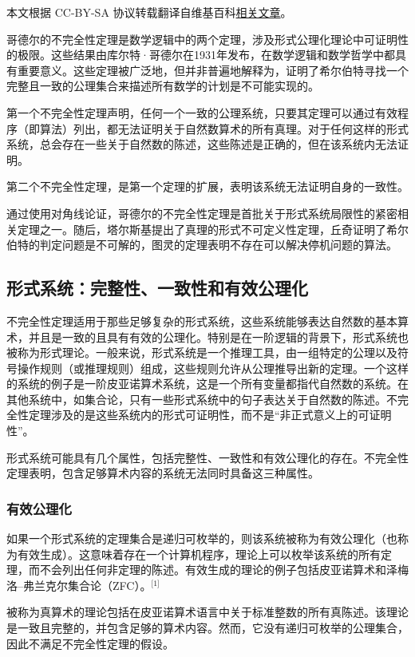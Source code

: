 
本文根据 CC-BY-SA 协议转载翻译自维基百科\href{https://en.wikipedia.org/wiki/G\%C3\%B6del\%27s_incompleteness_theorems}{相关文章}。

哥德尔的不完全性定理是数学逻辑中的两个定理，涉及形式公理化理论中可证明性的极限。这些结果由库尔特·哥德尔在1931年发布，在数学逻辑和数学哲学中都具有重要意义。这些定理被广泛地，但并非普遍地解释为，证明了希尔伯特寻找一个完整且一致的公理集合来描述所有数学的计划是不可能实现的。

第一个不完全性定理声明，任何一个一致的公理系统，只要其定理可以通过有效程序（即算法）列出，都无法证明关于自然数算术的所有真理。对于任何这样的形式系统，总会存在一些关于自然数的陈述，这些陈述是正确的，但在该系统内无法证明。

第二个不完全性定理，是第一个定理的扩展，表明该系统无法证明自身的一致性。

通过使用对角线论证，哥德尔的不完全性定理是首批关于形式系统局限性的紧密相关定理之一。随后，塔尔斯基提出了真理的形式不可定义性定理，丘奇证明了希尔伯特的判定问题是不可解的，图灵的定理表明不存在可以解决停机问题的算法。
\subsection{形式系统：完整性、一致性和有效公理化} 
不完全性定理适用于那些足够复杂的形式系统，这些系统能够表达自然数的基本算术，并且是一致的且具有有效的公理化。特别是在一阶逻辑的背景下，形式系统也被称为形式理论。一般来说，形式系统是一个推理工具，由一组特定的公理以及符号操作规则（或推理规则）组成，这些规则允许从公理推导出新的定理。一个这样的系统的例子是一阶皮亚诺算术系统，这是一个所有变量都指代自然数的系统。在其他系统中，如集合论，只有一些形式系统中的句子表达关于自然数的陈述。不完全性定理涉及的是这些系统内的形式可证明性，而不是“非正式意义上的可证明性”。

形式系统可能具有几个属性，包括完整性、一致性和有效公理化的存在。不完全性定理表明，包含足够算术内容的系统无法同时具备这三种属性。
\subsubsection{有效公理化}  
如果一个形式系统的定理集合是递归可枚举的，则该系统被称为有效公理化（也称为有效生成）。这意味着存在一个计算机程序，理论上可以枚举该系统的所有定理，而不会列出任何非定理的陈述。有效生成的理论的例子包括皮亚诺算术和泽梅洛–弗兰克尔集合论（ZFC）。\(^\text{[1]}\)

被称为真算术的理论包括在皮亚诺算术语言中关于标准整数的所有真陈述。该理论是一致且完整的，并包含足够的算术内容。然而，它没有递归可枚举的公理集合，因此不满足不完全性定理的假设。
